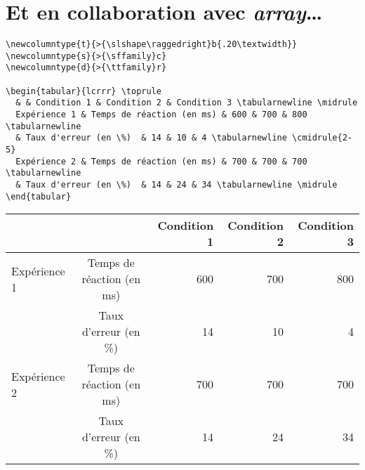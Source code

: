 \section{Et en collaboration avec \emph{array}\ldots}


\begin{boxedminipage}{\textwidth}
\begin{verbatim}
\newcolumntype{t}{>{\slshape\raggedright}b{.20\textwidth}}
\newcolumntype{s}{>{\sffamily}c}
\newcolumntype{d}{>{\ttfamily}r}

\begin{tabular}{lcrrr} \toprule
  & & Condition 1 & Condition 2 & Condition 3 \tabularnewline \midrule
  Expérience 1 & Temps de réaction (en ms) & 600 & 700 & 800 \tabularnewline
  & Taux d'erreur (en \%)  & 14 & 10 & 4 \tabularnewline \cmidrule{2-5}
  Expérience 2 & Temps de réaction (en ms) & 700 & 700 & 700 \tabularnewline
  & Taux d'erreur (en \%)  & 14 & 24 & 34 \tabularnewline \midrule
\end{tabular}
\end{verbatim}
\end{boxedminipage}

\begin{center}
  \begin{tabular}{tsddd} \toprule
    & & Condition 1 & Condition 2 & Condition 3 \tabularnewline \midrule
    Expérience 1 & Temps de réaction (en ms) & 600 & 700 & 800 \tabularnewline
    & Taux d'erreur (en \%)  & 14 & 10 & 4 \tabularnewline {}
    Expérience 2 & Temps de réaction (en ms) & 700 & 700 & 700 \tabularnewline
    & Taux d'erreur (en \%)  & 14 & 24 & 34 \tabularnewline \midrule
  \end{tabular}
\end{center}


